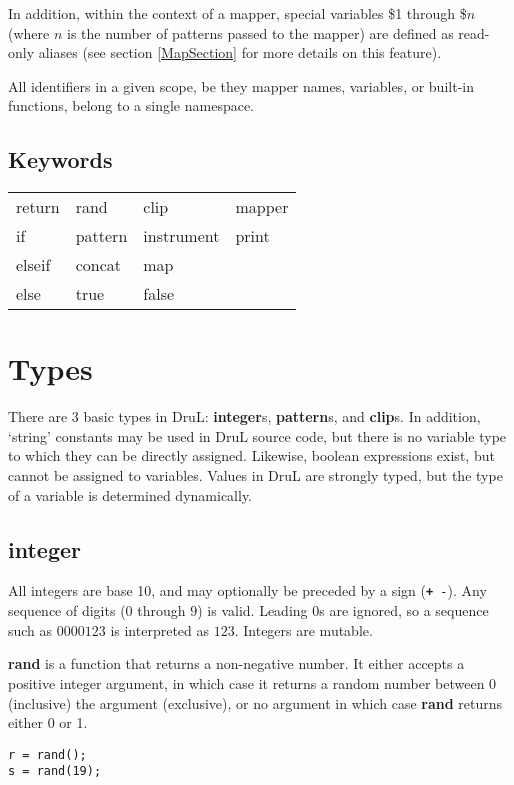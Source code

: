 In addition, within the context of a mapper, special variables \$1 through \$$n$ (where $n$ is the number of patterns passed to the mapper) are defined as read-only aliases (see section \ref{MapSection} for more details on this feature).

All identifiers in a given scope, be they mapper names, variables, or built-in functions, belong to a single namespace.

\subsection{Keywords}

\begin{table}[htb]
\begin{center}
\begin{tabular}{llll}
  return & rand    & clip       & mapper \\
  if     & pattern & instrument & print  \\
  elseif & concat  & map        &    \\
  else   & true    & false      &
\end{tabular}
\label{tab:keywords}
\end{center}
\end{table}



\section{Types}

There are $3$ basic types in DruL: \textbf{integer}s, \textbf{pattern}s,
and \textbf{clip}s.  In addition, `string' constants may be used in DruL source code, but there is no variable type to which they can be directly assigned.
Likewise, boolean expressions exist, but cannot be assigned to variables.
Values in DruL are strongly typed, but the type of a variable is determined dynamically.

\subsection{integer}

All integers are base 10, and may optionally be preceded by a sign ({\tt \textbf + -}).
Any sequence of digits ($0$ through $9$) is valid.  Leading $0$s are ignored, so a sequence such as $0000123$  is interpreted as $123$.  Integers are mutable.

\textbf{rand} is a function that returns a non-negative number.  It either accepts a positive integer argument, in which case it returns a random number between 0 (inclusive) the argument (exclusive), or no argument in which case \textbf{rand} returns either 0 or 1.
\begin{verbatim}
r = rand();
s = rand(19);
\end{verbatim}
